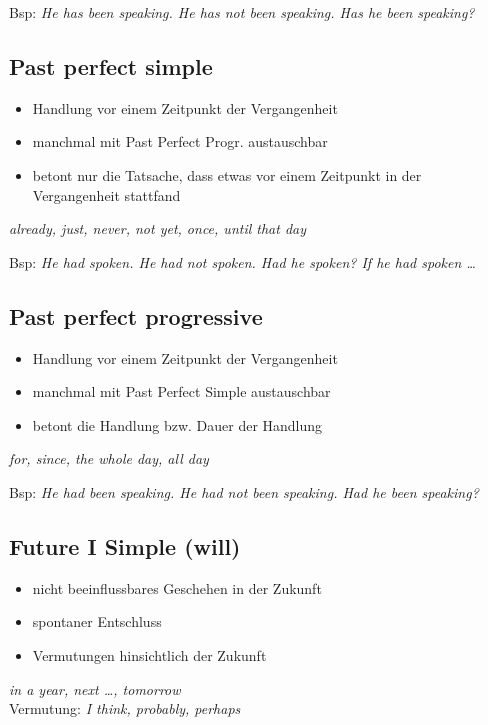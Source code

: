 Bsp: \textit{He  has been speaking. He has not been speaking. Has he been speaking?}

\subsection{Past perfect simple}
\begin{itemize}\itemsep0em
	\item Handlung vor einem Zeitpunkt der Vergangenheit
	\item manchmal mit Past Perfect Progr. austauschbar
	\item betont nur die Tatsache, dass etwas vor einem Zeitpunkt in der Vergangenheit stattfand
\end{itemize}
\textit{already, just, never, not yet, once, until that day}

Bsp: \textit{He had spoken. He had not spoken. Had he spoken? If he had spoken \dots}

\subsection{Past perfect progressive}
\begin{itemize}\itemsep0em
	\item Handlung vor einem Zeitpunkt der Vergangenheit
	\item manchmal mit Past Perfect Simple austauschbar
	\item betont die Handlung bzw. Dauer der Handlung
\end{itemize}
\textit{for, since, the whole day, all day}

Bsp: \textit{He had been speaking. He had not been speaking. Had he been speaking?}

\subsection{Future I Simple (will)}
\begin{itemize}\itemsep0em
	\item nicht beeinflussbares Geschehen in der Zukunft
	\item spontaner Entschluss
	\item Vermutungen hinsichtlich der Zukunft
\end{itemize}
\textit{in a year, next \dots, tomorrow}\\
Vermutung: \textit{I think, probably, perhaps}

